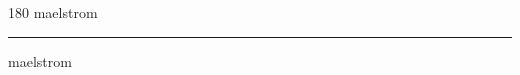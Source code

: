 
\begin{frame}
\begin{center}
\begin{turn}{180}
{\fontsize{2.5cm}{1em}\selectfont maelstrom}
\end{turn}
\vspace{1em}\par  
\hrule
\vspace{1em}\par  
{\fontsize{2.5cm}{1em}\selectfont maelstrom}
\end{center}
\end{frame}
